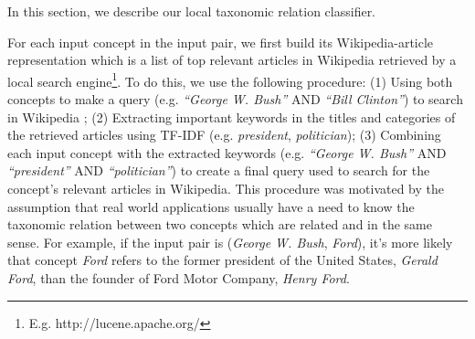 
In this section, we describe our local taxonomic relation classifier.

For each input concept in the input pair, we first build its
Wikipedia-article representation which is a list of top relevant
articles in Wikipedia retrieved by a local search
engine\footnote{E.g. http://lucene.apache.org/}. To do this, we use
the following procedure: (1) Using both concepts to make a query
(e.g. {\em ``George W. Bush''} AND {\em ``Bill Clinton''}) to search
in Wikipedia ; (2) Extracting important keywords in the titles and
categories of the retrieved articles using TF-IDF (e.g. {\em
  president}, {\em politician}); (3) Combining each input concept with
the extracted keywords (e.g. {\em ``George W. Bush''} AND {\em
  ``president''} AND {\em ``politician''}) to create a final query
used to search for the concept's relevant articles in Wikipedia. This
procedure was motivated by the assumption that real world applications
usually have a need to know the taxonomic relation between two
concepts which are related and in the same sense. For example, if the
input pair is ({\em George W. Bush}, {\em Ford}), it's more
likely that concept {\em Ford} refers to the former president of
the United States, {\em Gerald Ford}, than the founder of Ford Motor
Company, {\em Henry Ford}.

